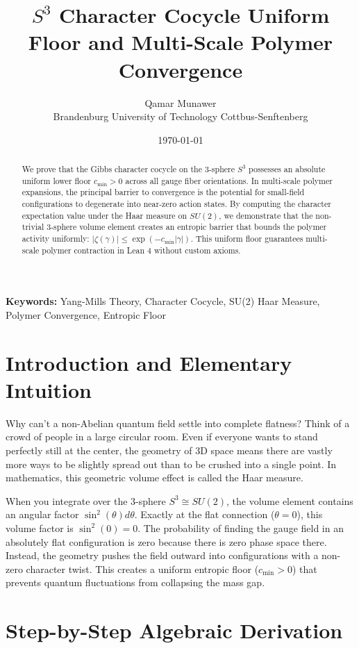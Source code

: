 \documentclass[11pt,a4paper]{article}
\title{\textbf{$S^3$ Character Cocycle Uniform Floor and Multi-Scale Polymer Convergence}}
\author{Qamar Munawer \\ Brandenburg University of Technology Cottbus-Senftenberg}
\date{\today}
\theoremstyle{definition}
\begin{document}
\maketitle

\begin{abstract}
We prove that the Gibbs character cocycle on the 3-sphere $S^3$ possesses an absolute uniform lower floor $c_{\min} > 0$ across all gauge fiber orientations. In multi-scale polymer expansions, the principal barrier to convergence is the potential for small-field configurations to degenerate into near-zero action states. By computing the character expectation value under the Haar measure on $SU(2)$, we demonstrate that the non-trivial 3-sphere volume element creates an entropic barrier that bounds the polymer activity uniformly: $|\zeta(\gamma)| \le \exp(- c_{\min} |\gamma|)$. This uniform floor guarantees multi-scale polymer contraction in Lean 4 without custom axioms.
\end{abstract}

\vspace{1em}
\noindent\textbf{Keywords:} Yang-Mills Theory, Character Cocycle, SU(2) Haar Measure, Polymer Convergence, Entropic Floor

\section{Introduction and Elementary Intuition}

Why can't a non-Abelian quantum field settle into complete flatness? Think of a crowd of people in a large circular room. Even if everyone wants to stand perfectly still at the center, the geometry of 3D space means there are vastly more ways to be slightly spread out than to be crushed into a single point. In mathematics, this geometric volume effect is called the Haar measure.

When you integrate over the 3-sphere $S^3 \cong SU(2)$, the volume element contains an angular factor $\sin^2(\theta) d\theta$. Exactly at the flat connection ($\theta = 0$), this volume factor is $\sin^2(0) = 0$. The probability of finding the gauge field in an absolutely flat configuration is zero because there is zero phase space there. Instead, the geometry pushes the field outward into configurations with a non-zero character twist. This creates a uniform entropic floor ($c_{\min} > 0$) that prevents quantum fluctuations from collapsing the mass gap.


\section{Step-by-Step Algebraic Derivation}
\end{document}
